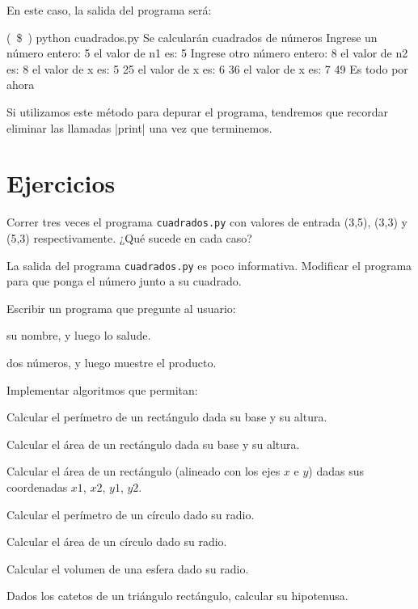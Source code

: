 En este caso, la salida del programa será:

\begin{codigo-nohl-sn}
(~\$~) python cuadrados.py
Se calcularán cuadrados de números
Ingrese un número entero: 5
el valor de n1 es: 5
Ingrese otro número entero: 8
el valor de n2 es: 8
el valor de x es: 5
25
el valor de x es: 6
36
el valor de x es: 7
49
Es todo por ahora
\end{codigo-nohl-sn}

Si utilizamos este método para depurar el programa, tendremos que recordar
eliminar las llamadas |print| una vez que terminemos.

\newpage
\section{Ejercicios}

\begin{ejercicio}
Correr tres veces el programa \lstinline!cuadrados.py! con valores
de entrada (3,5), (3,3) y (5,3) respectivamente. ¿Qué sucede en
cada caso?
\end{ejercicio}

\begin{ejercicio}
La salida del programa \lstinline!cuadrados.py! es poco
informativa. Modificar el programa para que ponga el
número junto a su cuadrado.
\end{ejercicio}

\begin{ejercicio}
Escribir un programa que pregunte al usuario:
\begin{partes}
  \item su nombre, y luego lo salude.
  \item dos números, y luego muestre el producto.
\end{partes}
\end{ejercicio}

\begin{ejercicio} Implementar algoritmos que permitan:
\begin{partes}
 \item Calcular el perímetro de un rectángulo dada su base y su altura.
 \item Calcular el área de un rectángulo dada su base y su altura.
 \item Calcular el área de un rectángulo (alineado con los ejes $x$ e $y$)
     dadas sus coordenadas $x1$, $x2$, $y1$, $y2$.
 \item Calcular el perímetro de un círculo dado su radio.
 \item Calcular el área de un círculo dado su radio.
 \item Calcular el volumen de una esfera dado su radio.
 \item Dados los catetos de un triángulo rectángulo, calcular su hipotenusa.
\end{partes}
\end{ejercicio}

